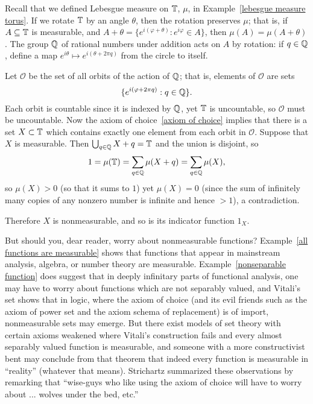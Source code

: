 \begin{example}
\label{Vitali set}
Recall that we defined Lebesgue measure on $\mathbb{T}$, $\mu$, in Example~\ref{lebesgue measure torus}.
If we rotate $\mathbb{T}$ by an angle $\theta$, then the rotation preserves $\mu$; that is, if $A \subseteq \mathbb{T}$ is measurable, and $A + \theta = \{e^{i(\varphi+\theta)}: e^{i\varphi} \in A\}$, then $\mu(A) = \mu(A + \theta)$.
The group $\mathbb{Q}$ of rational numbers under addition acts on $A$ by rotation: if $q \in \mathbb{Q}$, define a map $e^{i\theta} \mapsto e^{i(\theta + 2\pi q)}$ from the circle to itself.

Let $\mathcal O$ be the set of all orbits of the action of $\mathbb{Q}$; that is, elements of $\mathcal O$ are sets
\[\{e^{i(\varphi+2\pi q)}: q \in \mathbb{Q}\}.\]
Each orbit is countable since it is indexed by $\mathbb{Q}$, yet $\mathbb{T}$ is uncountable, so $\mathcal O$ must be uncountable.
Now the axiom of choice~\ref{axiom of choice} implies that there is a set $X \subset \mathbb{T}$ which contains exactly one element from each orbit in $\mathcal O$.
Suppose that $X$ is measurable. Then $\bigcup_{q \in \mathbb{Q}} X + q = \mathbb{T}$ and the union is disjoint, so
\[1 = \mu(\mathbb{T}) = \sum_{q \in \mathbb{Q}} \mu(X +  q) = \sum_{q \in \mathbb{Q}} \mu(X),\]
so $\mu(X) > 0$ (so that it sums to $1$) yet $\mu(X) = 0$ (since the sum of infinitely many copies of any nonzero number is infinite and hence $> 1$), a contradiction.

Therefore $X$ is nonmeasurable, and so is its indicator function $1_X$.
\end{example}

\begin{subsec}
But should you, dear reader, worry about nonmeasurable functions?
Example~\ref{all functions are measurable} shows that functions that appear in mainstream analysis, algebra, or number theory are measurable.
Example~\ref{nonseparable function} does suggest that in deeply infinitary parts of functional analysis, one may have to worry about functions which are not separably valued, and Vitali's set shows that in logic, where the axiom of choice (and its evil friends such as the axiom of power set and the axiom schema of replacement) is of import, nonmeasurable sets may emerge.
But there exist models of set theory \cite{Solovay1970} with certain axioms weakened where Vitali's construction fails and every almost separably valued function is measurable, and someone with a more constructivist bent may conclude from that theorem that indeed every function is measurable in ``reality'' (whatever that means).
Strichartz \cite[Chapter 1]{strichartz2003guide} summarized these observations by remarking that ``wise-guys who like using the axiom of choice will have to worry about ... wolves under the bed, etc.''
\end{subsec}

